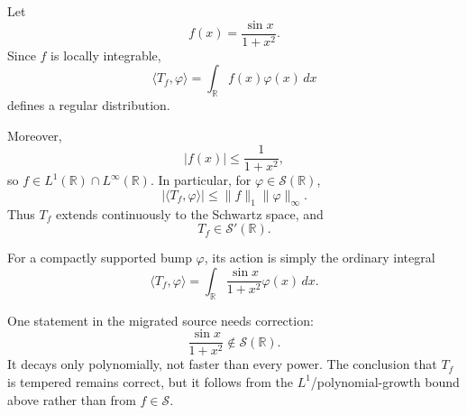 \begin{solution}
Let
\[
f(x)=\frac{\sin x}{1+x^2}.
\]
Since \(f\) is locally integrable,
\[
\langle T_f,\varphi\rangle
=
\int_{\mathbb R}f(x)\varphi(x)\,dx
\]
defines a regular distribution.

Moreover,
\[
|f(x)|\le\frac1{1+x^2},
\]
so \(f\in L^1(\mathbb R)\cap L^\infty(\mathbb R)\).  In particular,
for \(\varphi\in\mathcal S(\mathbb R)\),
\[
|\langle T_f,\varphi\rangle|
\le
\|f\|_1\|\varphi\|_\infty.
\]
Thus \(T_f\) extends continuously to the Schwartz space, and
\[
\boxed{T_f\in\mathcal S'(\mathbb R)}.
\]

For a compactly supported bump \(\varphi\), its action is simply the
ordinary integral
\[
\boxed{
\langle T_f,\varphi\rangle
=
\int_{\mathbb R}
\frac{\sin x}{1+x^2}\varphi(x)\,dx.
}
\]

One statement in the migrated source needs correction:
\[
\frac{\sin x}{1+x^2}\notin\mathcal S(\mathbb R).
\]
It decays only polynomially, not faster than every power.  The conclusion
that \(T_f\) is tempered remains correct, but it follows from the
\(L^1\)/polynomial-growth bound above rather than from \(f\in\mathcal S\).
\end{solution}


